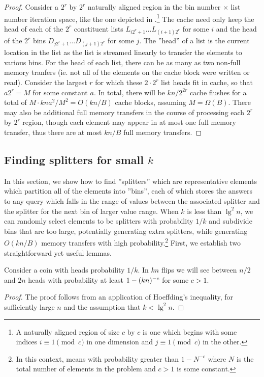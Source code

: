 \begin{proof}
Consider a $2^r$ by $2^r$ naturally aligned region in the bin number $\times$ list
number iteration space, like the one depicted in 
.\footnote{A naturally aligned region
of size $c$ by $c$ is one which begins with some indices $i \equiv 1 \pmod{c}$ 
in one dimension and $j \equiv 1 \pmod{c}$ in the other.}  
The cache need only keep the head of each of the $2^r$ constituent
lists $L_{i2^r + 1} \ldots L_{(i+1)2^r}$ for some $i$ and the head of the $2^r$ bins 
$D_{j2^r + 1} \ldots D_{(j+1)2^r}$ for some $j$. 
The ''head'' of a list is the current location
in the list as the list is streamed linearly to transfer the elements to various bins.  
For the head of each list, there can be as many as
two non-full memory tranfers (ie. not all of the elements on the cache block were
written or read).  Consider the largest $r$ for which these $2 \cdot 2^r$ list heads
fit in cache, so that $a2^r = M$ for some constant $a$.  In total, there will be 
$kn/2^{2r}$ cache flushes for a total of $M \cdot kna^2/M^2 = O(kn/B)$ cache blocks, 
assuming $M = \Omega(B)$.  There may also be additional full memory transfers in the
course of processing each $2^r$ by $2^r$ region, though
each element may appear in at most one full memory transfer, thus there are at most
$kn/B$ full memory transfers.  
\end{proof}

\subsection*{Finding splitters for small $k$}

In this section, we show how to find ''splitters'' which are representative elements
which partition all of the elements into ''bins'', each of which stores the answers to any
query which falls in the range of values between the associated splitter and the
splitter for the next bin of larger value range.
When $k$ is less than $\lg^2 n$, we can randomly select elements to be splitters
with probability $1/k$ and subdivide bins that are too large, potentially generating
extra splitters, while generating $O(kn/B)$ memory transfers with high
probability.\footnote{In this context, 
 means with probability greater
than $1-N^{-c}$ where $N$ is the total number of elements in the problem and $c > 1$
is some constant.} First, we establish two straightforward yet useful lemmas.

\begin{lemma}
  Consider a coin with heads probability $1/k$.  In $kn$ flips we will see
  between $n/2$ and $2n$ heads with probability at least $1-\mathopen{}\left(kn\right)\mathclose{}^{-c}$ for some $c>1$.
  \label{lem:number_of_flips}
\end{lemma}
\begin{proof}
  The proof follows from an application of Hoeffding's inequality, for sufficiently
  large $n$ and the assumption that $k < \lg ^2 n$.
\end{proof}

